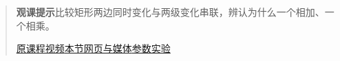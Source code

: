 \begin{quote}\small\textbf{观课提示}\quad 比较矩形两边同时变化与两级变化串联，辨认为什么一个相加、一个相乘。

\href{https://www.youtube.com/watch?v=YG15m2VwSjA}{原课程视频}\quad\href{https://vitael04213.github.io/3blue1brown-notes/lessons/chain-rule-and-product-rule.html}{本节网页与媒体}\quad\href{https://vitael04213.github.io/3blue1brown-notes/lab.html\#derivative}{参数实验}
\end{quote}
